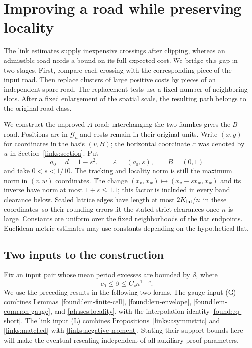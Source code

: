\section{Improving a road while preserving locality}
\label{improvement:section}

The link estimates supply inexpensive crossings after clipping, whereas
an admissible road needs a bound on its full expected cost. We bridge this
gap in two stages. First, compare each crossing with the corresponding
piece of the input road. Then replace clusters of large positive costs by
pieces of an independent spare road. The replacement tests use a fixed
number of neighboring slots. After a fixed enlargement of the spatial
scale, the resulting path belongs to the original road class.

We construct the improved $A$-road; interchanging the two families gives
the $B$-road. Positions are in $\mathcal G_n$ and costs remain in their
original units. Write $(x,y)$ for coordinates in the basis $(v,B)$;
the horizontal coordinate $x$ was denoted by $u$ in
Section~\ref{links:section}. Put
\[
 a_0=d=1-s^2,\qquad A=(a_0,s),\qquad B=(0,1)
\]
and take $0<s<1/10$. The tracking and locality norm is still the maximum
norm in $(v,w)$ coordinates. The change
$(x_v,x_w)\mapsto(x_v-sx_w,x_w)$ and its inverse have norm at most
$1+s\le1.1$; this factor is included in every band clearance below.
Scaled lattice edges have length at most $2K_{\rm lat}/n$ in these
coordinates, so their rounding errors fit the stated strict clearances
once $n$ is large. Constants are uniform over the fixed neighborhoods of
the flat endpoints. Euclidean metric estimates may use constants
depending on the hypothetical flat.

\subsection{Two inputs to the construction}
\label{improvement:interfaces}

Fix an input pair whose mean period excesses are bounded by $\beta$, where
\[
 c_0\leq\beta\leq C_s n^{1-c}.
\]
We use the preceding results in the following two forms. The gauge
input (G) combines Lemmas~\ref{found:lem-finite-cell},
\ref{found:lem-envelope}, \ref{found:lem-common-gauge}, and
\ref{phases:locality}, with the interpolation identity
\eqref{found:eq-short}. The link input (L) combines
Propositions~\ref{links:asymmetric} and \ref{links:matched} with
\eqref{links:negative-moment}. Stating their support bounds here will make
the eventual rescaling independent of all auxiliary proof parameters.

